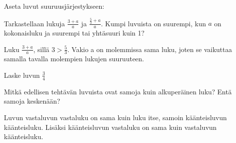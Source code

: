 \begin{tehtavasivu}
\begin{tehtava}
Aseta luvut suuruusjärjestykseen:
\begin{alakohdat}
\end{alakohdat}
\begin{vastaus}
\begin{alakohdat}
\end{alakohdat}
\end{vastaus}
\end{tehtava}

\begin{tehtava}
 Tarkastellaan lukuja $\frac{3+a}{a}$ ja $\frac{\frac{5}{3}+a}{a}$. Kumpi luvuista on suurempi, kun \(a\) on kokonaisluku ja suurempi tai yhtäsuuri kuin 1?
 \begin{vastaus}
  Luku $\frac{3+a}{a}$, sillä $3>\frac{5}{3}$. Vakio a on molemmissa sama luku, joten se vaikuttaa samalla tavalla molempien lukujen suuruuteen.
 \end{vastaus}
\end{tehtava}


\begin{tehtava}
Laske luvun $\frac{3}{4}$
	\begin{alakohdat}
	\end{alakohdat}
	\begin{vastaus}
		\begin{alakohdat}
			\alakohta{$\frac{-3}{4}$}
			\alakohta{$\frac{4}{3}$}
			\alakohta{$\frac{3}{4}$}
			\alakohta{$-\frac{4}{3}$}
			\alakohta{$-\frac{4}{3}$}
			\alakohta{$\frac{3}{4}$}
		\end{alakohdat}
	\end{vastaus}
\end{tehtava}


\begin{tehtava}
Mitkä edellisen tehtävän luvuista ovat samoja kuin alkuperäinen luku? Entä samoja keskenään?
	\begin{vastaus}
		Luvun vastaluvun vastaluku on sama kuin luku itse, samoin käänteisluvun käänteisluku. Lisäksi käänteisluvun vastaluku on sama kuin vastaluvun käänteisluku. 
	\end{vastaus}
\end{tehtava}


\end{tehtavasivu}
